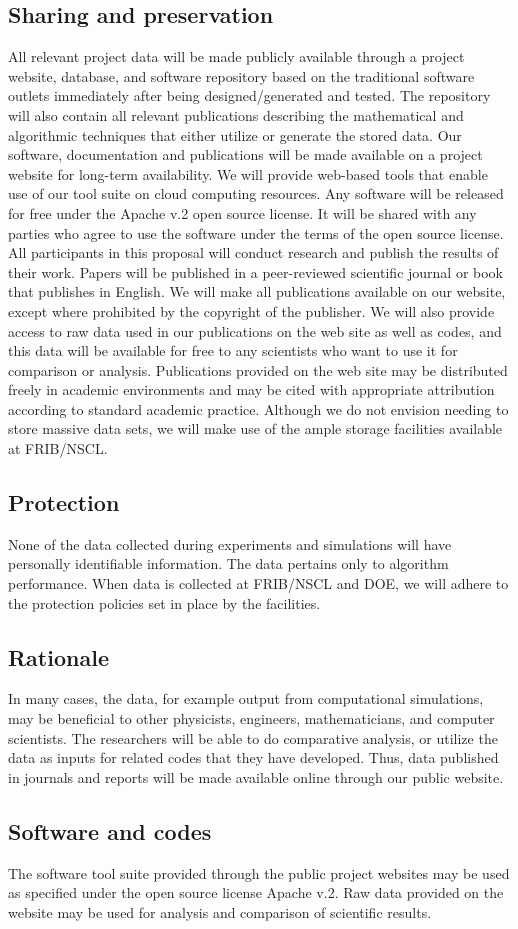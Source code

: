 \documentclass[10pt]{article}
\begin{document}
\subsection{Sharing and preservation}
All relevant project data will be made publicly available through a project website, database,
and software repository based on the traditional software outlets immediately after being designed/generated and tested. The repository will also contain all relevant publications describing
the mathematical and algorithmic techniques that either utilize or generate the stored data. Our
software, documentation and publications will be made available on a project website for long-term
availability. We will provide web-based tools that enable use of our tool suite on cloud computing
resources. Any software will be released for
free under the Apache v.2 open source license. It will be shared with any parties who agree to
use the software under the terms of the open source license. All participants in this proposal will
conduct research and publish the results of their work. Papers will be published in a peer-reviewed
scientific journal or book that publishes in English. We will
make all publications available on our website, except where prohibited by the copyright of the
publisher. We will also provide access to raw data used in our publications on the web site as well as codes, and
this data will be available for free to any scientists who want to use it for comparison or analysis.
Publications provided on the web site may be distributed freely in academic environments and
may be cited with appropriate attribution according to standard academic practice. Although we
do not envision needing to store massive data sets, we will make use of the ample storage facilities
available at FRIB/NSCL.
\subsection{Protection}
None of the data collected during experiments and simulations will have personally identifiable
information. The data pertains only to algorithm performance. When data is collected at FRIB/NSCL
and DOE, we will adhere to the protection policies set in place by the facilities.
\subsection{Rationale}
In many cases, the data, for example output from computational simulations, may be beneficial to
other physicists, engineers, mathematicians, and computer scientists. The researchers will be able
to do comparative analysis, or utilize the data as inputs for related codes that they have developed.
Thus, data published in journals and reports will be made available online through our public
website.
\subsection{Software and codes}
The software tool suite provided through the public project websites may be used as specified
under the open source license Apache v.2. Raw data provided on the website may be used for
analysis and comparison of scientific results.
\end{document}
